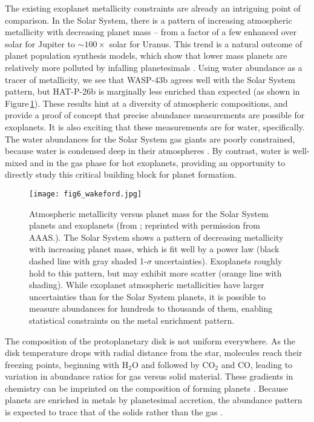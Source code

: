 \documentclass[graybox,natbib,nosecnum]{svmult}
\begin{document}
The existing exoplanet metallicity constraints are already an intriguing point of comparison. In the Solar System, there is a pattern of increasing atmospheric metallicity with decreasing planet mass  -- from a factor of a few enhanced over solar for Jupiter to $\sim100\times$ solar for Uranus. This trend is a natural outcome of planet population synthesis models, which show that lower mass planets are relatively more polluted by infalling planetesimals \citep{fortney13, mordasini16}. Using water abundance as a tracer of metallicity, we see that WASP-43b agrees well with the Solar System pattern, but HAT-P-26b is marginally less enriched than expected (as shown in Figure\,\ref{fig:massZ}).  These results hint at a diversity of atmospheric compositions, and provide a proof of concept that precise abundance measurements are possible for exoplanets. It is also exciting that these measurements are for water, specifically. The water abundances for the Solar System gas giants are poorly constrained, because water is condensed deep in their atmospheres \citep{showman98, mousis14}. By contrast, water is well-mixed and in the gas phase for hot exoplanets, providing an opportunity to directly study this critical building block for planet formation.

 
\begin{figure}
\begin{centering}
\texttt{[image: fig6\_wakeford.jpg]}
\caption{Atmospheric metallicity versus planet mass for the Solar System planets and exoplanets (from \citealt{wakeford17}; reprinted with permission from AAAS.). The Solar System shows a pattern of decreasing metallicity with increasing planet mass, which is fit well by a power law (black dashed line with gray shaded 1-$\sigma$ uncertainties). Exoplanets roughly hold to this pattern, but may exhibit more scatter (orange line with shading). While exoplanet atmospheric metallicities have larger uncertainties than for the Solar System planets, it is possible to measure abundances for hundreds to thousands of them, enabling statistical constraints on the metal enrichment pattern.} 
\label{fig:massZ}       
\end{centering}
\end{figure}

The composition of the protoplanetary disk is not uniform everywhere. As the disk temperature drops with radial distance from the star, molecules reach their freezing points, beginning with H$_2$O and followed by CO$_2$ and CO, leading to variation in abundance ratios for gas versus solid material. These gradients in chemistry can be imprinted on the composition of forming planets \citep[e.g.][]{oberg11, madhusudhan14, alidib16}. Because planets are enriched in metals by planetesimal accretion, the abundance pattern is expected to trace that of the solids rather than the gas \citep{mordasini16, espinoza17}.
\end{document}
